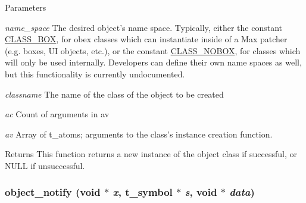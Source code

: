 \begin{DoxyParams}{Parameters}
\item[{\em name\_\-space}]The desired object's name space. Typically, either the constant \hyperlink{group__class_gaf640c99a1fceb8158c2d1e77381b0320}{CLASS\_\-BOX}, for obex classes which can instantiate inside of a Max patcher (e.g. boxes, UI objects, etc.), or the constant \hyperlink{group__class_ga090d3cbc4f137661806fc1b72249a791}{CLASS\_\-NOBOX}, for classes which will only be used internally. Developers can define their own name spaces as well, but this functionality is currently undocumented. \item[{\em classname}]The name of the class of the object to be created \item[{\em ac}]Count of arguments in {\ttfamily av} \item[{\em av}]Array of t\_\-atoms; arguments to the class's instance creation function.\end{DoxyParams}
\begin{DoxyReturn}{Returns}
This function returns a new instance of the object class if successful, or NULL if unsuccessful. 
\end{DoxyReturn}
\hypertarget{group__obj_ga6297b81c3a70f7fb2201c7262e96bba3}{
\subsubsection[{object\_\-notify}]{ object\_\-notify (void $\ast$ {\em x}, \/  {\bf t\_\-symbol} $\ast$ {\em s}, \/  void $\ast$ {\em data})}}
\label{group__obj_ga6297b81c3a70f7fb2201c7262e96bba3}


